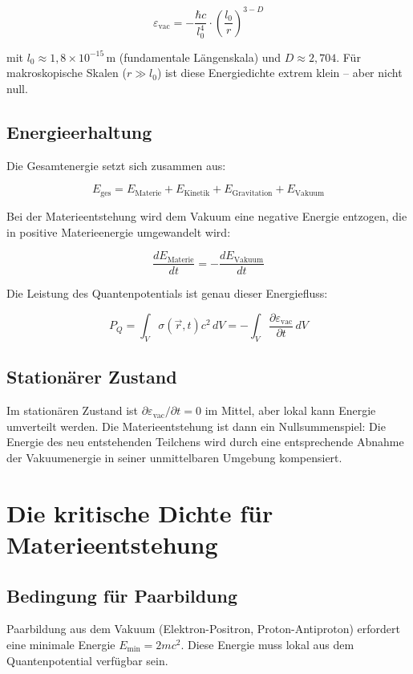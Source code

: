 \[
\varepsilon_{\text{vac}} = -\frac{\hbar c}{l_0^4} \cdot \left( \frac{l_0}{r} \right)^{3-D} \tag{J.8}
\]

mit \( l_0 \approx 1,8 \times 10^{-15} \, \text{m} \) (fundamentale Längenskala) 
und \( D \approx 2,704 \). Für makroskopische Skalen (\( r \gg l_0 \)) ist diese 
Energiedichte extrem klein – aber nicht null.

\subsection{Energieerhaltung}

Die Gesamtenergie setzt sich zusammen aus:

\[
E_{\text{ges}} = E_{\text{Materie}} + E_{\text{Kinetik}} + E_{\text{Gravitation}} + 
E_{\text{Vakuum}}
\]

Bei der Materieentstehung wird dem Vakuum eine negative Energie entzogen, die in 
positive Materieenergie umgewandelt wird:

\[
\frac{dE_{\text{Materie}}}{dt} = -\frac{dE_{\text{Vakuum}}}{dt}
\]

Die Leistung des Quantenpotentials ist genau dieser Energiefluss:

\[
P_Q = \int_V \sigma(\vec{r}, t) c^2 \, dV = -\int_V \frac{\partial \varepsilon_{\text{vac}}}{\partial t} \, dV \tag{J.9}
\]

\subsection{Stationärer Zustand}

Im stationären Zustand ist \( \partial \varepsilon_{\text{vac}} / \partial t = 0 \) im Mittel, 
aber lokal kann Energie umverteilt werden. Die Materieentstehung ist dann ein 
Nullsummenspiel: Die Energie des neu entstehenden Teilchens wird durch eine 
entsprechende Abnahme der Vakuumenergie in seiner unmittelbaren Umgebung kompensiert.

\section{Die kritische Dichte für Materieentstehung}

\subsection{Bedingung für Paarbildung}

Paarbildung aus dem Vakuum (Elektron-Positron, Proton-Antiproton) erfordert eine 
minimale Energie \( E_{\text{min}} = 2mc^2 \). Diese Energie muss lokal aus dem 
Quantenpotential verfügbar sein.

